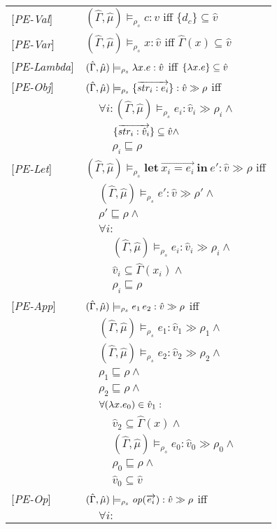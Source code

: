 \documentclass[[12pt,a4paper,twoside,openrigh]{article}
\newcommand{\vat}[0]{\hat{v}}
\newcommand{\muat}[0]{\hat{\mu}}
\newcommand{\Env}[0]{\hat{\Gamma}}
\newcommand{\modelrho}{\models_{\rho_s}}
\newcommand{\aenvs}{(\Env,\muat)}
\newcommand{\caesti}[2]{\aenvs \modelrho #1 : \vat_{#2} \gg \rho_{#2}}
\newcommand{\caest}[1]{\aenvs \modelrho #1 : \vat \gg \rho}
\newcommand{\letexprs}[3]{\mathbf{let}\ \vec{#1 = #2}\ \mathbf{in}\ #3}
\begin{document}
\begin{tabular}{l l l l}
{[\textit{PE-Val}]}&\multicolumn{3}{l}{$\aenvs \modelrho c : \vat$ iff $\{d_c\} \subseteq \vat$} \\
{[\textit{PE-Var}]}&\multicolumn{3}{l}{$\aenvs \modelrho x : \vat$ iff $\Env(x) \subseteq \vat$} \\ 
{[\textit{PE-Lambda}]}&\multicolumn{3}{l}{$\aenvs \modelrho \lam{x}{e} : \vat$ iff $\{\lam{x}{e}\} \subseteq \vat$} \\
{[\textit{PE-Obj}]}&\multicolumn{3}{l}{$\caest {\rec{\vec{str_i : e_i}}}$ iff} \\
&&\multicolumn{2}{l}{$\forall i: \caesti {e_i} {i} \wedge$}\\
&&&$\rec{\vec{str_i :\vat_i}} \subseteq \vat \wedge$ \\
&&&$\rho_i \sqsubseteq \rho$ \\ 
{[\textit{PE-Let}]}&\multicolumn{3}{l}{$\caest {\letexprs{x_i}{e_i}{e'}}$ iff}\\
&&\multicolumn{2}{l}{$\aenvs \modelrho e' : \vat \gg \rho' \wedge$} \\
&&\multicolumn{2}{l}{$\rho' \sqsubseteq \rho \wedge$} \\
&&\multicolumn{2}{l}{$ \forall i:$}\\
&&& $\caesti {e_i} {i} \wedge$ \\
&&& $\vat_i \subseteq \Env(x_i) \wedge$ \\
&&& $\rho_i \sqsubseteq \rho$ \\
{[\textit{PE-App}]}&\multicolumn{3}{l}{$\caest {\appl {e_1} {e_2}}$ iff} \\
&&\multicolumn{2}{l}{$\caesti {e_1} {1} \wedge$} \\
&&\multicolumn{2}{l}{$\caesti {e_2} {2} \wedge$} \\
&&\multicolumn{2}{l}{$\rho_1 \sqsubseteq \rho \wedge$} \\
&&\multicolumn{2}{l}{$\rho_2 \sqsubseteq \rho \wedge$} \\
&&\multicolumn{2}{l}{$\forall (\lam{x}{e_0}) \in \vat_1 :$}\\
&&&$\vat_2 \subseteq \Env(x) \wedge$\\
&&&$\caesti {e_0} {0} \wedge$\\ 
&&&$\rho_0 \sqsubseteq \rho \wedge$\\
&&&$\vat_0 \subseteq \vat $\\
{[\textit{PE-Op}]}&\multicolumn{3}{l}{$\caest {\op (\vec{e_i})} $ iff}\\
&&\multicolumn{2}{l}{$\forall i :$}\\

\end{tabular}
\end{document}
